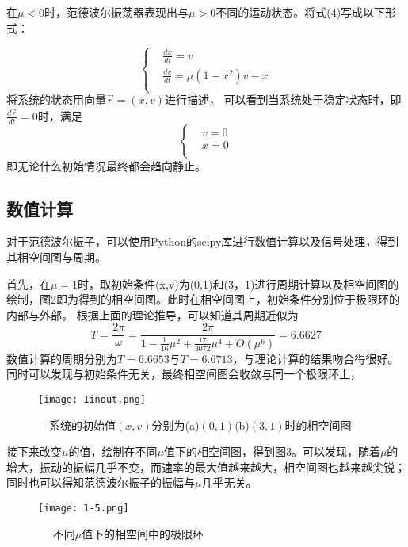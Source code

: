 \documentclass[10.5pt,oneside,a4paper]{article}
\theoremstyle{mystyle}
\begin{document}
在$\mu<0$时，范德波尔振荡器表现出与$\mu>0$不同的运动状态。将式(4)写成以下形式：

\begin{equation} 
    \left \{
    \begin{aligned}
    &\frac{dx}{dt}=v\\
    &\frac{dv}{dt}=\mu(1-x^2)v-x\\
    \end{aligned}
    \right.
\end{equation}
将系统的状态用向量$\vec{r}=(x,v)$进行描述，
可以看到当系统处于稳定状态时，即$\frac{d\vec{r}}{dt}=0$时，满足
\begin{equation} 
    \left \{
    \begin{aligned}
    &v=0\\
    &x=0\\
    \end{aligned}
    \right.
\end{equation}
即无论什么初始情况最终都会趋向静止。

\subsection{数值计算}

对于范德波尔振子，可以使用Python的scipy库进行数值计算以及信号处理，得到其相空间图与周期。

首先，在$\mu=1$时，取初始条件(x,v)为(0,1)和(3，1)进行周期计算以及相空间图的绘制，图2即为得到的相空间图。此时在相空间图上，初始条件分别位于极限环的内部与外部。
根据上面的理论推导，可以知道其周期近似为
\begin{equation}
    T=\frac{2\pi}{\omega}=\frac{2\pi}{1-\frac{1}{16}\mu^2+\frac{17}{3072}\mu^4+O(\mu^6)}=6.6627
\end{equation}
数值计算的周期分别为$T=6.6653$与$T=6.6713$，与理论计算的结果吻合得很好。同时可以发现与初始条件无关，最终相空间图会收敛与同一个极限环上，

\begin{figure}
    \centering
    \texttt{[image: 1inout.png]}
    \caption{$\quad$系统的初始值$(x,v)$分别为(a)$(0,1)$(b)$(3,1)$时的相空间图}
\end{figure}
  
接下来改变$\mu$的值，绘制在不同$\mu$值下的相空间图，得到图3。可以发现，随着$\mu$的增大，振动的振幅几乎不变，而速率的最大值越来越大，相空间图也越来越尖锐；
同时也可以得知范德波尔振子的振幅与$\mu$几乎无关。


\begin{figure}
    \centering
    \texttt{[image: 1-5.png]}
    \caption{$\quad$ 不同$\mu$值下的相空间中的极限环}
\end{figure}
\end{document}
